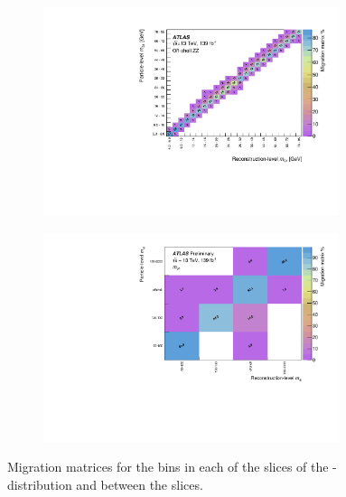 \begin{figure}[htb]
  \begin{subfigure}{.49\textwidth}\centering\includegraphics[width = 0.95\textwidth]{Figures/m4l/UnfoldingStudies/v014_matrices/m34_m4loffshellMatrix.pdf}\end{subfigure}
  \begin{subfigure}{.49\textwidth}\centering\includegraphics[width = 0.95\textwidth]{Figures/m4l/UnfoldingStudies/v014_matrices/m34_m4lMatrix.pdf}\end{subfigure}
\caption{Migration matrices for the \mZTwo bins in each of the \mFourL slices of the \mZTwo-\mFourL distribution and between the slices.}
 \end{figure}



